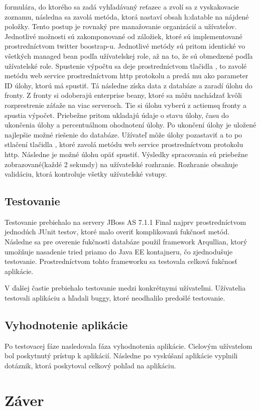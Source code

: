formulára, do ktorého sa zadá vyhľadávaný reťazec a zvolí sa z vyskakovacie zoznamu, následna sa zavolá metóda, ktorá nastaví obsah h:datable na nájdené položky. Tento postup je rovnaký pre manažovanie organizácií a užívateĺov. Jednotlivé možnosti sú zakomponované od záložiek, ktoré sú implementované prostredníctvom twitter boostrap-u. Jednotlivé metódy sú pritom identické vo všetkých managed bean podľa užívatelskej role, až na to, že sú obmedzené podľa užívatelské role. Spustenie výpočtu sa deje prostredníctvom tlačidla , to zavolé metódu  web service prostredníctvom http protokolu a predá mu ako parameter ID úlohy, ktorú má spustiť. Tá následne získa data z databáze a zaradí úlohu do fronty. Z fronty si odoberajú enterprise beany, ktoré sa môžu nachádzať kvôli rozprestrenie záťaže na viac serveroch. Tie si úlohu vyberú z actiemsq fronty a spustia výpočet. Priebežne pritom ukladajú údaje o stavu úlohy, času do ukončenia úlohy a percentuálnom ohodnotení úlohy. Po ukončení úlohy je uložené najlepšie možné riešenie do databáze. Užívateľ môže úlohy pozastaviť a to po stlačení tlačidla , ktoré zavolá metódu web service prostredníctvom protokolu http. Následne je možné úlohu opäť spustiť. Výsledky spracovania sú priebežne zobrazované(každé 2 sekundy) na užívateľské rozhranie. Rozhranie obsahuje validáciu, ktorá kontroluje všetky užívateľské vstupy.



\section{Testovanie}
Testovanie prebiehalo na servery JBoss AS 7.1.1 Final najprv prostredníctvom jednodúch JUnit testov, ktoré malo overiť komplikovanú fukčnosť metód. Následne sa pre overenie fukčnosti databáze použil framework Arqullian, ktorý umožňuje nasadenie tried priamo do Java EE kontajneru, čo zjednodušuje testovanie. Prostredníctvom tohto frameworku sa testovala celková fukčnosť aplikácie.

V ďalšej častie prebiehalo testovanie medzi konkrétnymi užívateľmi. Užívatelia testovali aplikáciu a hľadali buggy, ktoré neodhalilo predošlé testovanie.




\section{Vyhodnotenie aplikácie}
Po testovacej fáze nasledovala fáza vyhodnotenia aplikácie. Cielovým užívatelom bol poskytnutý prístup k aplikácií. Následne po vyskúšaní aplikácie vyplnili dotáznik, ktorá poskytoval celkový pohľad na aplikáciu.


















\chapter{Záver}



